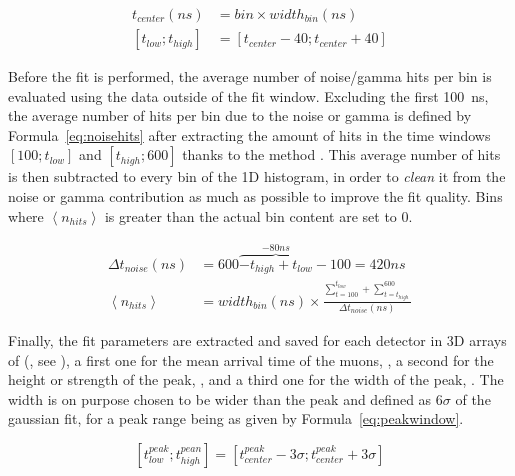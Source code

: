 	\begin{subequations}
	\label{eq:fitwindow}
	\begin{align}
		t_{center}(ns) & = bin \times width_{bin}(ns)\\
		[t_{low};t_{high}] & = [t_{center} - 40; t_{center} + 40]
	\end{align}
	\end{subequations}
	
	Before the fit is performed, the average number of noise/gamma hits per bin is evaluated using the data outside of the fit window. Excluding the first \SI{100}{ns}, the average number of hits per bin due to the noise or gamma is defined by Formula~\ref{eq:noisehits} after extracting the amount of hits in the time windows $[100;t_{low}]$ and $[t_{high};600]$ thanks to the method . This average number of hits is then subtracted to every bin of the 1D histogram, in order to \textit{clean} it from the noise or gamma contribution as much as possible to improve the fit quality. Bins where $\left\langle n_{hits} \right\rangle$ is greater than the actual bin content are set to 0.
	
	\begin{subequations}
	\label{eq:noisehits}
	\begin{align}
		\Delta t_{noise}(ns) & = 600 \overbrace{- t_{high} + t_{low}}^{-80ns} - 100 = 420ns \\
		\left\langle n_{hits} \right\rangle & = width_{bin}(ns) \times \frac{\sum_{t=100}^{t_{low}}+\sum_{t=t_{high}}^{600}}{\Delta t_{noise}(ns)}
	\end{align}
	\end{subequations}
	
	Finally, the fit parameters are extracted and saved for each detector in 3D arrays of  (, see ), a first one for the mean arrival time of the muons, , a second for the height or strength of the peak, , and a third one for the width of the peak, . The width is on purpose chosen to be wider than the peak and defined as 6$\sigma$ of the gaussian fit, for a peak range being as given by Formula~\ref{eq:peakwindow}.
	
	\begin{equation}
	\label{eq:peakwindow}
		 [t^{peak}_{low};t^{pean}_{high}]  = [t^{peak}_{center}-3\sigma; t^{peak}_{center}+3\sigma]
	\end{equation}
	
